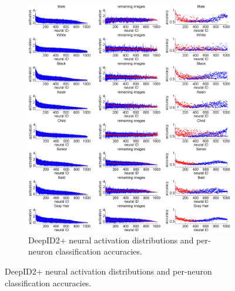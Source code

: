 \documentclass[10pt,twocolumn,letterpaper]{article}
\begin{document}
\begin{figure}[tb!]
\centering

\begin{subfigure}{0.98\linewidth}
\includegraphics[width = 0.98\linewidth]{picture/3.png}
\vspace{-0.02in}
\caption{DeepID2+ neural activation distributions and per-neuron classification accuracies.}
\label{fig:attcnn}
\vspace{0.0in}
\end{subfigure}


\end{figure}
\end{document}
